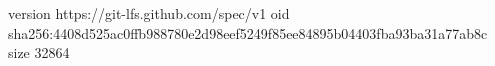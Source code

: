 version https://git-lfs.github.com/spec/v1
oid sha256:4408d525ac0ffb988780e2d98eef5249f85ee84895b04403fba93ba31a77ab8c
size 32864
